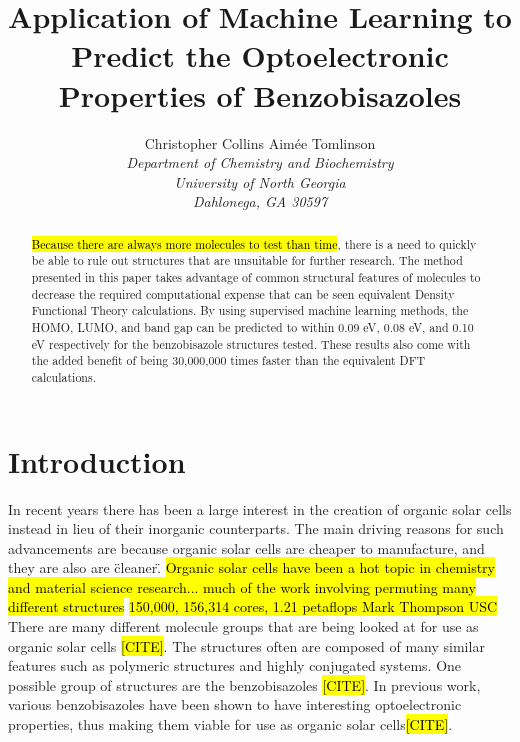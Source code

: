 \documentclass[10pt]{article}
\begin{document}
\title{Application of Machine Learning to Predict the Optoelectronic Properties of Benzobisazoles}
\author{Christopher Collins \qquad Aim\'{e}e Tomlinson\\
        \emph{Department of Chemistry and Biochemistry}\\
        \emph{University of North Georgia}\\
        \emph{Dahlonega, GA 30597}}

\maketitle

\begin{abstract}
\hl{Because there are always more molecules to test than time}, there is a need to quickly be able to rule out structures that are unsuitable for further research. The method presented in this paper takes advantage of common structural features of molecules to decrease the required computational expense that can be seen equivalent Density Functional Theory calculations. By using supervised machine learning methods, the HOMO, LUMO, and band gap can be predicted to within 0.09 eV, 0.08 eV, and 0.10 eV respectively for the benzobisazole structures tested. These results also come with the added benefit of being 30,000,000 times faster than the equivalent DFT calculations.
\end{abstract}

\section{Introduction}

In recent years there has been a large interest in the creation of organic solar cells instead in lieu of their inorganic counterparts. The main driving reasons for such advancements are because organic solar cells are cheaper to manufacture, and they are also are \"cleaner\".
\hl{Organic solar cells have been a hot topic in chemistry and material science research... much of the work involving permuting many different structures } \hl{150,000, 156,314 cores, 1.21 petaflops Mark Thompson USC}
There are many different molecule groups that are being looked at for use as organic solar cells \hl{[CITE]}. The structures often are composed of many similar features such as polymeric structures and highly conjugated systems. One possible group of structures are the benzobisazoles \hl{[CITE]}. In previous work, various benzobisazoles have been shown to have interesting optoelectronic properties, thus making them viable for use as organic solar cells\hl{[CITE]}.
\end{document}
